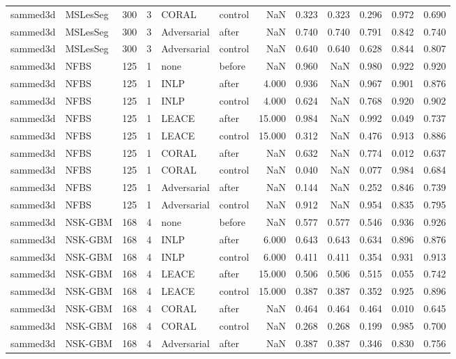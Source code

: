 \begin{tabular}{llrrllrrrrrr}
sammed3d & MSLesSeg & 300 & 3 & CORAL & control & NaN & 0.323 & 0.323 & 0.296 & 0.972 & 0.690 \\
sammed3d & MSLesSeg & 300 & 3 & Adversarial & after & NaN & 0.740 & 0.740 & 0.791 & 0.842 & 0.740 \\
sammed3d & MSLesSeg & 300 & 3 & Adversarial & control & NaN & 0.640 & 0.640 & 0.628 & 0.844 & 0.807 \\
sammed3d & NFBS & 125 & 1 & none & before & NaN & 0.960 & NaN & 0.980 & 0.922 & 0.920 \\
sammed3d & NFBS & 125 & 1 & INLP & after & 4.000 & 0.936 & NaN & 0.967 & 0.901 & 0.876 \\
sammed3d & NFBS & 125 & 1 & INLP & control & 4.000 & 0.624 & NaN & 0.768 & 0.920 & 0.902 \\
sammed3d & NFBS & 125 & 1 & LEACE & after & 15.000 & 0.984 & NaN & 0.992 & 0.049 & 0.737 \\
sammed3d & NFBS & 125 & 1 & LEACE & control & 15.000 & 0.312 & NaN & 0.476 & 0.913 & 0.886 \\
sammed3d & NFBS & 125 & 1 & CORAL & after & NaN & 0.632 & NaN & 0.774 & 0.012 & 0.637 \\
sammed3d & NFBS & 125 & 1 & CORAL & control & NaN & 0.040 & NaN & 0.077 & 0.984 & 0.684 \\
sammed3d & NFBS & 125 & 1 & Adversarial & after & NaN & 0.144 & NaN & 0.252 & 0.846 & 0.739 \\
sammed3d & NFBS & 125 & 1 & Adversarial & control & NaN & 0.912 & NaN & 0.954 & 0.835 & 0.795 \\
sammed3d & NSK-GBM & 168 & 4 & none & before & NaN & 0.577 & 0.577 & 0.546 & 0.936 & 0.926 \\
sammed3d & NSK-GBM & 168 & 4 & INLP & after & 6.000 & 0.643 & 0.643 & 0.634 & 0.896 & 0.876 \\
sammed3d & NSK-GBM & 168 & 4 & INLP & control & 6.000 & 0.411 & 0.411 & 0.354 & 0.931 & 0.913 \\
sammed3d & NSK-GBM & 168 & 4 & LEACE & after & 15.000 & 0.506 & 0.506 & 0.515 & 0.055 & 0.742 \\
sammed3d & NSK-GBM & 168 & 4 & LEACE & control & 15.000 & 0.387 & 0.387 & 0.352 & 0.925 & 0.896 \\
sammed3d & NSK-GBM & 168 & 4 & CORAL & after & NaN & 0.464 & 0.464 & 0.464 & 0.010 & 0.645 \\
sammed3d & NSK-GBM & 168 & 4 & CORAL & control & NaN & 0.268 & 0.268 & 0.199 & 0.985 & 0.700 \\
sammed3d & NSK-GBM & 168 & 4 & Adversarial & after & NaN & 0.387 & 0.387 & 0.346 & 0.830 & 0.756 \\

\end{tabular}
